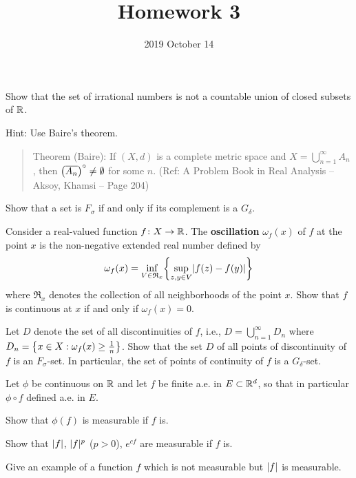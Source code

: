 \documentclass{../homework}
\title{Homework 3}
\author{}
\date{2019 October 14}
\begin{document}
\begin{problems}
\item Show that the set of irrational numbers is not a countable union
  of closed subsets of \(\RR\).

  Hint: Use Baire's theorem.
  \begin{quote}
    Theorem (Baire): If \((X, d)\) is a complete metric space and
    \(X = \bigcup_{n=1}^\infty A_n\), then
    \(\prn*{\overline{A_n}}^\circ \ne \emptyset\) for some \(n\).
    (Ref: A Problem Book in Real Analysis -- Aksoy, Khamsi -- Page
    204)
  \end{quote}

  \begin{solution}
  \end{solution}

\item
  \begin{problems}
  \item Show that a set is \(F_\sigma\) if and only if its complement
    is a \(G_\delta\).
  \item Consider a real-valued function \(f \colon X \to \RR\).  The
    \textbf{oscillation} \(\omega_f(x)\) of \(f\) at the point \(x\)
    is the non-negative extended real number defined by
    \[
      \omega_f(x) = \inf_{V \in \mathfrak R_x}
      \set*{\sup_{z, y \in V} \abs{f(z) - f(y)}}
    \]
    where \(\mathfrak R_x\) denotes the collection of all
    neighborhoods of the point \(x\).  Show that \(f\) is continuous
    at \(x\) if and only if \(\omega_f(x) = 0\).

  \item Let \(D\) denote the set of all discontinuities of \(f\),
    i.e., \(D = \bigcup_{n=1}^\infty D_n\) where
    \(D_n = \set*{x \in X : \omega_f(x) \ge \frac 1 n}\).  Show that
    the set \(D\) of all points of discontinuity of \(f\) is an
    \(F_\sigma\)-set.  In particular, the set of points of continuity
    of \(f\) is a \(G_\delta\)-set.
  \end{problems}

  \begin{solution}
    \begin{problems}
    \item
    \item
    \item
    \end{problems}
  \end{solution}

\item Let \(\phi\) be continuous on \(\RR\) and let \(f\) be finite
  a.e. in \(E \subset \RR^d\), so that in particular \(\phi \circ f\)
  defined a.e. in \(E\).
  \begin{problems}
  \item Show that \(\phi(f)\) is measurable if \(f\) is.
  \item Show that \(\abs f\), \(\abs f^p\) (\(p > 0\)), \(e^{cf}\) are
    measurable if \(f\) is.
  \item Give an example of a function \(f\) which is not measurable
    but \(\abs f\) is measurable.
  \end{problems}


\end{problems}
\end{document}
